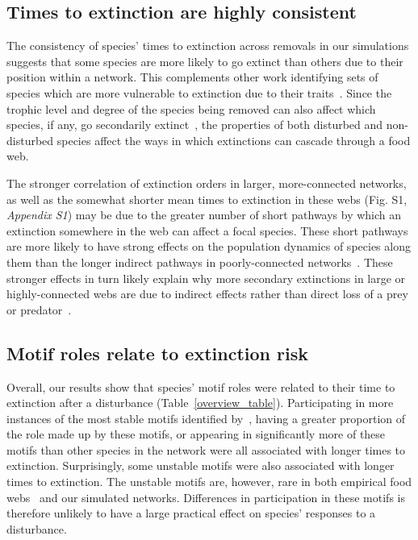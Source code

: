 \documentclass[12pt]{article}
\begin{document}
\begin{spacing}{2.0}
 	\subsection*{Times to extinction are highly consistent}

		The consistency of species' times to extinction across removals in our simulations suggests that some species are more likely to go extinct than others due to their position within a network.
        This complements other work identifying sets of species which are more vulnerable to extinction due to their traits~\citep{Curtsdotter2011,Ryser2019}. 
		Since the trophic level and degree of the species being removed can also affect which species, if any, go secondarily extinct~\citep{Wootton2016a,Dunne2002}, the properties of both disturbed and non-disturbed species affect the ways in which extinctions can cascade through a food web.
		
		
		The stronger correlation of extinction orders in larger, more-connected networks, as well as the somewhat shorter mean times to extinction in these webs (Fig. S1, \emph{Appendix S1}) may be due to the greater number of short pathways by which an extinction somewhere in the web can affect a focal species. 
		These short pathways are more likely to have strong effects on the population dynamics of species along them than the longer indirect pathways in poorly-connected networks~\citep{Jordan2002,Jordan2006}.
		These stronger effects in turn likely explain why more secondary extinctions in large or highly-connected webs are due to indirect effects rather than direct loss of a prey or predator~\citet{Wootton2016a}. 


	\subsection*{Motif roles relate to extinction risk}

		Overall, our results show that species' motif roles were related to their time to extinction after a disturbance (Table~\ref{overview_table}).
		Participating in more instances of the most stable motifs identified by~\citet{Stouffer2007,Borrelli2015a}, having a greater proportion of the role made up by these motifs, or appearing in significantly more of these motifs than other species in the network were all associated with longer times to extinction. 
		Surprisingly, some unstable motifs were also associated with longer times to extinction.
		The unstable motifs are, however, rare in both empirical food webs~\citep{Stouffer2007} and our simulated networks.
		Differences in participation in these motifs is therefore unlikely to have a large practical effect on species' responses to a disturbance.
        

\end{spacing}
\end{document}
